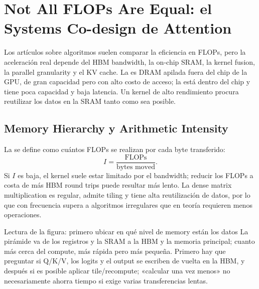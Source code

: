 \section{Not All FLOPs Are Equal: el Systems Co-design de Attention}

Los artículos sobre algoritmos suelen comparar la eficiencia en FLOPs, pero la aceleración real depende del HBM bandwidth, la on-chip SRAM, la kernel fusion, la parallel granularity y el KV cache. La  es DRAM apilada fuera del chip de la GPU, de gran capacidad pero con alto costo de acceso; la  está dentro del chip y tiene poca capacidad y baja latencia. Un kernel de alto rendimiento procura reutilizar los datos en la SRAM tanto como sea posible.

\subsection{Memory Hierarchy y Arithmetic Intensity}

La  se define como cuántos FLOPs se realizan por cada byte transferido:
\[
I=\frac{\text{FLOPs}}{\text{bytes moved}}.
\]
Si $I$ es baja, el kernel suele estar limitado por el bandwidth; reducir los FLOPs a costa de más HBM round trips puede resultar más lento. La dense matrix multiplication es regular, admite tiling y tiene alta reutilización de datos, por lo que con frecuencia supera a algoritmos irregulares que en teoría requieren menos operaciones.


\begin{knowledgebox}{Lectura de la figura: primero ubicar en qué nivel de memory están los datos}
La pirámide va de los registros y la SRAM a la HBM y la memoria principal; cuanto más cerca del compute, más rápida pero más pequeña. Primero hay que preguntar si Q/K/V, los logits y el output se escriben de vuelta en la HBM, y después si es posible aplicar tile/recompute; «calcular una vez menos» no necesariamente ahorra tiempo si exige varias transferencias lentas.
\end{knowledgebox}


